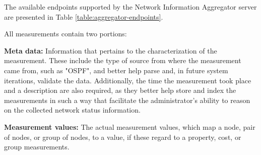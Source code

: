     The available endpoints supported by the Network Information Aggregator server are presented in Table \ref{table:aggregator-endpoints}.

\begin{table}[H]
\caption{Network Information Aggregator's available endpoints}
\label{table:aggregator-endpoints}
\end{table}

    All measurements contain two portions:

    \begin{itemize}
        \textbf{Meta data:} Information that pertains to the characterization of the measurement.
        These include the type of source from where the measurement came from, such as "OSPF", and better help parse and, in future system iterations, validate the data.
        Additionally, the time the measurement took place and a description are also required, as they better help store and index the measurements in such a way that facilitate the administrator's ability to reason on the collected network status information.

        \textbf{Measurement values:} The actual measurement values, which map a node, pair of nodes, or group of nodes, to a value, if these regard to a property, cost, or group measurements.
    \end{itemize}

